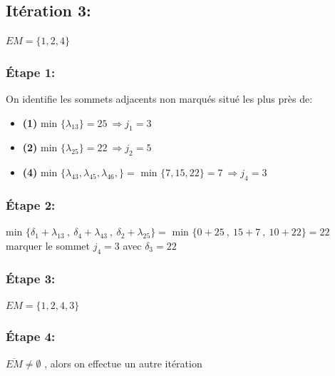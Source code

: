 \documentclass{article}
\begin{document}
\pagebreak 

\subsection*{Itération 3:}
$EM = \{1,2,4\}$
\subsubsection*{Étape 1:}
On identifie les sommets adjacents non marqués situé les plus près de:
\begin{itemize}
    \item \textbf{(1)} min $\{\lambda_{13}\}=25 \: \Rightarrow j_1 =3$ \\
    \item \textbf{(2)} min $\{\lambda_{25}\}=22 \: \Rightarrow j_2 =5$ \\
    \item \textbf{(4)} min $\{\lambda_{43},\lambda_{45},\lambda_{46},\}=$ min $\{7,15,22\}=7 \: \Rightarrow j_4 =3$ \\
\end{itemize}
\subsubsection*{Étape 2:}
min $\{ \delta_1 + \lambda_{13}\: , \:\delta_4+\lambda_{43} \: ,\:\delta_2+\lambda_{25}\} = $ min $\{0+25 \:,\:15+7 \:,\:10+22\}=22 $\\
marquer le sommet $j_4=3$ avec $\delta_3=22$\\ 
\subsubsection*{Étape 3:}
$EM=\{1,2,4,3\}$
\subsubsection*{Étape 4:}
$\overline{EM} \neq \emptyset $ , alors on effectue un autre itération
\end{document}
